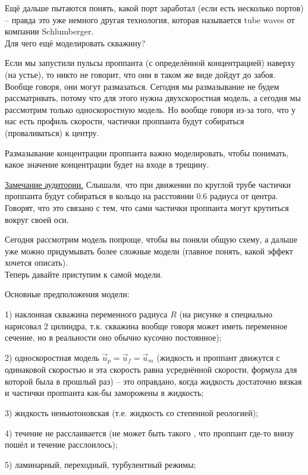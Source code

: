 \documentclass[main.tex]{subfiles}
\begin{document}
Ещё дальше пытаются понять, какой порт заработал (если есть несколько портов) -- правда это уже немного другая технология, которая называется tube waves от компании Schlumberger.
\\

Для чего ещё моделировать скважину?

Если мы запустили пульсы проппанта (с определённой концентрацией) наверху (на устье), то никто не говорит, что они в таком же виде дойдут до забоя.
Вообще говоря, они могут размазаться.
Сегодня мы размазывание не будем рассматривать, потому что для этого нужна двухскоростная модель, а сегодня мы рассмотрим только односкоростную модель.
Но вообще говоря из-за того, что у нас есть профиль скорости, частички проппанта будут собираться (проваливаться) к центру.

Размазывание концентрации проппанта важно моделировать, чтобы понимать, какое значение концентрации будет на входе в трещину.


\underline{Замечание аудитории.}
Слышали, что при движении по круглой трубе частички проппанта будут собираться в кольцо на расстоянии 0.6 радиуса от центра.
Говорят, что это связано с тем, что сами частички проппанта могут крутиться вокруг своей оси.


Сегодня рассмотрим модель попроще, чтобы вы поняли общую схему, а дальше уже можно придумывать более сложные модели (главное понять, какой эффект хочется описать).
\\

Теперь давайте приступим к самой модели.

Основные предположения модели:

1) наклонная скважина переменного радиуса $R$ (на рисунке я специально нарисовал 2 цилиндра, т.к. скважина вообще говоря может иметь переменное сечение, но в реальности оно обычно кусочно постоянное);

2) односкоростная модель $\vec{u}_p=\vec{u}_f=\vec{u}_m$ (жидкость и проппант движутся с одинаковой скоростью и эта скорость равна усреднённой скорости, формула для которой была в прошлый раз) -- это оправдано, когда жидкость достаточно вязкая и частички проппанта как-бы заморожены в жидкость;

3) жидкость неньютоновская (т.е. жидкость со степенной реологией);

4) течение не расслаивается (не может быть такого , что проппант где-то внизу пошёл и течение расслоилось);

5) ламинарный, переходный, турбулентный режимы;
\end{document}

